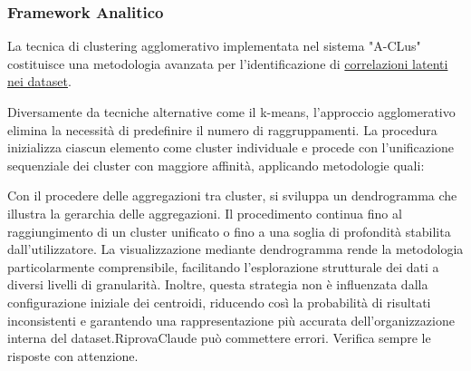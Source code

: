 \subsubsection{Framework Analitico}

La tecnica di clustering agglomerativo implementata nel sistema "A-CLus" costituisce una metodologia avanzata per l'identificazione di \underline{correlazioni latenti nei dataset}. 

Diversamente da tecniche alternative come il k-means, l'approccio agglomerativo elimina la necessità di predefinire il numero di raggruppamenti. La procedura inizializza ciascun elemento come cluster individuale e procede con l'unificazione sequenziale dei cluster con maggiore affinità, applicando metodologie quali:  



Con il procedere delle aggregazioni tra cluster, si sviluppa un dendrogramma che illustra la gerarchia delle aggregazioni. Il procedimento continua fino al raggiungimento di un cluster unificato o fino a una soglia di profondità stabilita dall'utilizzatore. La visualizzazione mediante dendrogramma rende la metodologia particolarmente comprensibile, facilitando l'esplorazione strutturale dei dati a diversi livelli di granularità. Inoltre, questa strategia non è influenzata dalla configurazione iniziale dei centroidi, riducendo così la probabilità di risultati inconsistenti e garantendo una rappresentazione più accurata dell'organizzazione interna del dataset.RiprovaClaude può commettere errori. Verifica sempre le risposte con attenzione.


